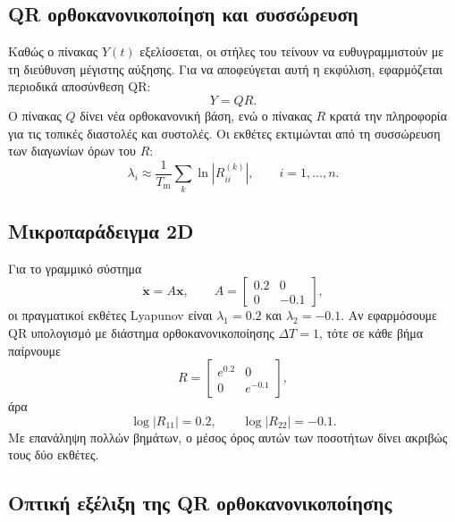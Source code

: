 \documentclass[11pt,a4paper]{report}
\begin{document}
\subsection{QR ορθοκανονικοποίηση και συσσώρευση}
\label{app:lyapunov-qr-details}

Καθώς ο πίνακας $Y(t)$ εξελίσσεται, οι στήλες του τείνουν να ευθυγραμμιστούν
με τη διεύθυνση μέγιστης αύξησης. Για να αποφεύγεται αυτή η εκφύλιση,
εφαρμόζεται περιοδικά αποσύνθεση QR:
\begin{equation}
Y = QR.
\end{equation}
Ο πίνακας $Q$ δίνει νέα ορθοκανονική βάση, ενώ ο πίνακας $R$ κρατά την
πληροφορία για τις τοπικές διαστολές και συστολές. Οι εκθέτες εκτιμώνται από
τη συσσώρευση των διαγωνίων όρων του $R$:
\begin{equation}
\lambda_i \approx \frac{1}{T_{\mathrm{m}}}\sum_k \ln |R_{ii}^{(k)}|,
\qquad i=1,\dots,n.
\end{equation}

\subsection{Μικροπαράδειγμα 2D}
\label{app:lyapunov-2d-example}

Για το γραμμικό σύστημα
\begin{equation}
\dot{\mathbf{x}}=A\mathbf{x},\qquad
A=
\begin{bmatrix}
0.2 & 0\\
0 & -0.1
\end{bmatrix},
\end{equation}
οι πραγματικοί εκθέτες Lyapunov είναι $\lambda_1=0.2$ και $\lambda_2=-0.1$.
Αν εφαρμόσουμε QR υπολογισμό με διάστημα ορθοκανονικοποίησης $\Delta T=1$,
τότε σε κάθε βήμα παίρνουμε
\begin{equation}
R=
\begin{bmatrix}
e^{0.2} & 0\\
0 & e^{-0.1}
\end{bmatrix},
\end{equation}
άρα
\begin{equation}
\log|R_{11}|=0.2,\qquad \log|R_{22}|=-0.1.
\end{equation}
Με επανάληψη πολλών βημάτων, ο μέσος όρος αυτών των ποσοτήτων δίνει ακριβώς
τους δύο εκθέτες.

\subsection{Οπτική εξέλιξη της QR ορθοκανονικοποίησης}
\label{app:lyapunov-qr-figures}
\end{document}
